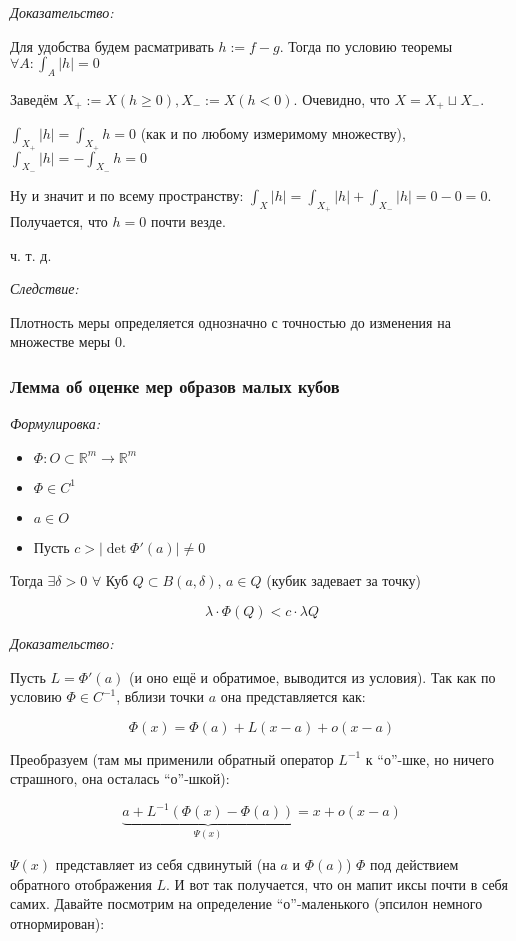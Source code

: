 \documentclass{article}
\def\dbl{\,\,}
\begin{document}
\textit{Доказательство:}

Для удобства будем расматривать $h := f - g$. Тогда по условию теоремы $\forall A: \int_{A} |h| = 0$

Заведём $X_+ := X(h \ge 0), X_- := X(h < 0)$. Очевидно, что $X = X_+ \sqcup X_-$.

$\int_{X_+} |h| = \int_{X_+} h = 0$ (как и по любому измеримому множеству), $\int_{X_-} |h| = -\int_{X_-} h = 0$

Ну и значит и по всему пространству: $\int_{X} |h| = \int_{X_+} |h| + \int_{X_-} |h| = 0 - 0 = 0$. Получается, что $h = 0$ почти везде.

ч. т. д.

\textit{Следствие: }

Плотность меры определяется однозначно с точностью до изменения на множестве меры 0.

\subsubsection{Лемма об оценке мер образов малых кубов}
\textit{Формулировка:}

\begin{itemize}
    \item $\Phi: O \subset \mathbb{R}^{m} \rightarrow \mathbb{R}^{m}$
    \item $\Phi \in C^{1}$
    \item $a \in O$
    \item Пусть $c > |\det \Phi'(a)| \neq 0$
\end{itemize}

Тогда $\exists \delta > 0 \dbl \forall$ Куб $Q \subset B(a, \delta)$, $a \in Q$ (кубик задевает за точку)

\[\lambda \cdot \Phi(Q) < c \cdot \lambda Q\]

\textit{Доказательство:}

Пусть $L = \Phi'(a)$ (и оно ещё и обратимое, выводится из условия). Так как по условию $\Phi \in C^{-1}$, вблизи точки $a$ она представляется как:

\[\Phi(x) = \Phi(a) + L (x - a) + o(x - a)\]

Преобразуем (там мы применили обратный оператор $L^{-1}$ к ``о''-шке, но ничего страшного, она осталась ``о''-шкой):

\[\underbrace{a + L^{-1}(\Phi(x) - \Phi(a))}_{\Psi(x)} = x + o(x - a)\]

$\Psi(x)$ представляет из себя сдвинутый (на $a$ и $\Phi(a)$) $\Phi$ под действием обратного отображения $L$. И вот так получается, что он мапит иксы почти в себя самих. Давайте посмотрим на определение ``о''-маленького (эпсилон немного отнормирован):
\end{document}
